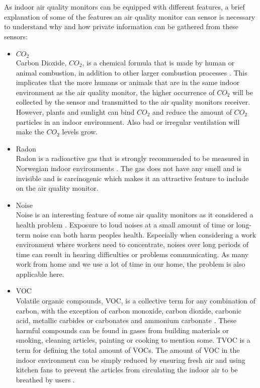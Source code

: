 \\\\
As indoor air quality monitors can be equipped with different features, a brief explanation of some of the features an air quality monitor can sensor is necessary to understand why and how private information can be gathered from these sensors:
\begin{itemize}
    \item \(CO_2\)\\
        Carbon Dioxide, \(CO_2\), is a chemical formula that is made by human or animal combustion, in addition to other larger combustion processes \cite{CO2}. This implicates that the more humans or animals that are in the same indoor environment as the air quality monitor, the higher occurrence of \(CO_2\) will be collected by the sensor and transmitted to the air quality monitors receiver. However, plants and sunlight can bind \(CO_2\) and reduce the amount of \(CO_2\) particles in an indoor environment. Also bad or irregular ventilation will make the \(CO_2\) levels grow.
    \item Radon\\
        Radon is a radioactive gas that is strongly recommended to be measured in Norwegian indoor environments \cite{Radon}. The gas does not have any smell and is invisible and is carcinogenic which makes it an attractive feature to include on the air quality monitor. 
    \item Noise\\
        Noise is an interesting feature of some air quality monitors as it considered a health problem \cite{Noise}. Exposure to loud noises at a small amount of time or long-term noise can both harm peoples health. Especially when considering a work environment where workers need to concentrate, noises over long periods of time can result in hearing difficulties or problems communicating. As many work from home and we use a lot of time in our home, the problem is also applicable here. 
    \item VOC\\
        Volatile organic compounds, VOC, is a collective term for any combination of carbon, with the exception of carbon monoxide, carbon dioxide, carbonic acid, metallic carbides or carbonates and ammonium carbonate \cite{VOC}. These harmful compounds can be found in gases from building materials or smoking, cleaning articles, painting or cooking to mention some. TVOC is a term for defining the total amount of VOCs. The amount of VOC in the indoor environment can be simply reduced by ensuring fresh air and using kitchen fans to prevent the articles from circulating the indoor air to be breathed by users \cite{RecommendedIAQ}.

\end{itemize}
